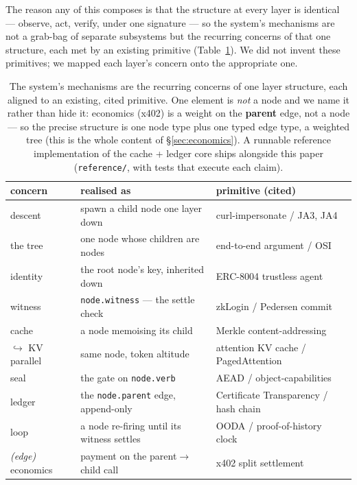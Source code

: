\documentclass[11pt]{article}
\begin{document}
The reason any of this composes is that the structure at every layer is identical
--- observe, act, verify, under one signature --- so the system's mechanisms are not
a grab-bag of separate subsystems but the recurring concerns of that one structure,
each met by an existing primitive (Table~\ref{tab:atoms}). We did not invent these
primitives; we mapped each layer's concern onto the appropriate one.

\begin{table}[h]
\centering
\small
\begin{tabular}{@{}lll@{}}
\hline
\textbf{concern} & \textbf{realised as} & \textbf{primitive (cited)} \\
\hline
descent      & spawn a child node one layer down      & curl-impersonate / JA3, JA4~\cite{curlimpersonate,ja3,ja4} \\
the tree     & one node whose children are nodes      & end-to-end argument / OSI~\cite{e2e,osi} \\
identity     & the root node's key, inherited down    & ERC-8004 trustless agent~\cite{erc8004} \\
witness      & \texttt{node.witness} --- the settle check & zkLogin / Pedersen commit~\cite{zklogin,pedersen} \\
cache        & a node memoising its child             & Merkle content-addressing~\cite{merkle} \\
\quad $\hookrightarrow$ KV parallel & same node, token altitude & attention KV cache / PagedAttention~\cite{attention,pagedattention} \\
seal         & the gate on \texttt{node.verb}         & AEAD / object-capabilities~\cite{rfc5116,ocap} \\
ledger       & the \texttt{node.parent} edge, append-only & Certificate Transparency / hash chain~\cite{rfc6962,bitcoin} \\
loop         & a node re-firing until its witness settles & OODA / proof-of-history clock~\cite{ooda,solana} \\
\emph{(edge)} economics & payment on the parent$\to$child call & x402 split settlement~\cite{x402} \\
\hline
\end{tabular}
\caption{The system's mechanisms are the recurring concerns of one layer structure,
each aligned to an existing, cited primitive. One element is \emph{not} a node and we
name it rather than hide it: economics (x402) is a weight on the \textbf{parent}
edge, not a node --- so the precise structure is one node type plus one typed edge
type, a weighted tree (this is the whole content of \S\ref{sec:economics}). A
runnable reference implementation of the cache + ledger core ships alongside this
paper (\texttt{reference/}, with tests that execute each claim).}
\label{tab:atoms}
\end{table}
\end{document}
